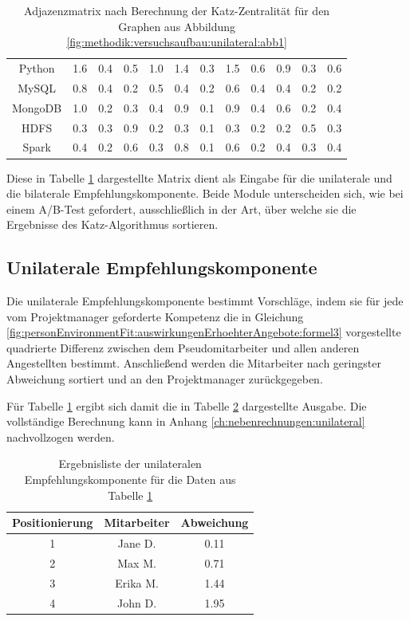 \begin{table}[h]
\begin{tabular}{c|c|c|c|c|c|c|c|c|c|c|c}
		Python   & 1.6 & 0.4 & 0.5 & 1.0 & 1.4 & 0.3 & 1.5 & 0.6 & 0.9 & 0.3 & 0.6\\
		MySQL    & 0.8 & 0.4 & 0.2 & 0.5 & 0.4 & 0.2 & 0.6 & 0.4 & 0.4 & 0.2 & 0.2\\
		MongoDB  & 1.0 & 0.2 & 0.3 & 0.4 & 0.9 & 0.1 & 0.9 & 0.4 & 0.6 & 0.2 & 0.4\\
		HDFS     & 0.3 & 0.3 & 0.9 & 0.2 & 0.3 & 0.1 & 0.3 & 0.2 & 0.2 & 0.5 & 0.3\\
		Spark    & 0.4 & 0.2 & 0.6 & 0.3 & 0.8 & 0.1 & 0.6 & 0.2 & 0.4 & 0.3 & 0.4
	\end{tabular}
	\caption{Adjazenzmatrix nach Berechnung der Katz-Zentralität für den Graphen aus Abbildung \ref{fig:methodik:versuchsaufbau:unilateral:abb1}}
	\label{tbl:methodik:versuchsaufbau:unilateral:tbl1}
\end{table}

Diese in Tabelle \ref{tbl:methodik:versuchsaufbau:unilateral:tbl1} dargestellte Matrix dient als Eingabe für die unilaterale und die bilaterale Empfehlungskomponente. Beide Module unterscheiden sich, wie bei einem A/B-Test gefordert, ausschließlich in der Art, über welche sie die Ergebnisse des Katz-Algorithmus sortieren.

\subsection{Unilaterale Empfehlungskomponente}
\label{ch:methodik:versuchsaufbau:unilateral}
Die unilaterale Empfehlungskomponente bestimmt Vorschläge, indem sie für jede vom Projektmanager geforderte Kompetenz die in Gleichung \ref{fig:personEnvironmentFit:auswirkungenErhoehterAngebote:formel3} vorgestellte quadrierte Differenz zwischen dem Pseudomitarbeiter und allen anderen Angestellten bestimmt. Anschließend werden die Mitarbeiter nach geringster Abweichung sortiert und an den Projektmanager zurückgegeben.

Für Tabelle \ref{tbl:methodik:versuchsaufbau:unilateral:tbl1} ergibt sich damit die in Tabelle \ref{tbl:methodik:versuchsaufbau:unilateral:tbl2} dargestellte Ausgabe. Die vollständige Berechnung kann in Anhang \ref{ch:nebenrechnungen:unilateral} nachvollzogen werden.

\begin{table}[h]
	\centering
	\begin{tabular}{c|c|c}
		Positionierung & Mitarbeiter & Abweichung\\
		\hline
		1 & Jane D.  & 0.11\\
		2 & Max M.   & 0.71\\
		3 & Erika M. & 1.44\\
		4 & John D.  & 1.95
	\end{tabular}
	\caption{Ergebnisliste der unilateralen Empfehlungskomponente für die Daten aus Tabelle \ref{tbl:methodik:versuchsaufbau:unilateral:tbl1}}
	\label{tbl:methodik:versuchsaufbau:unilateral:tbl2}
\end{table}

